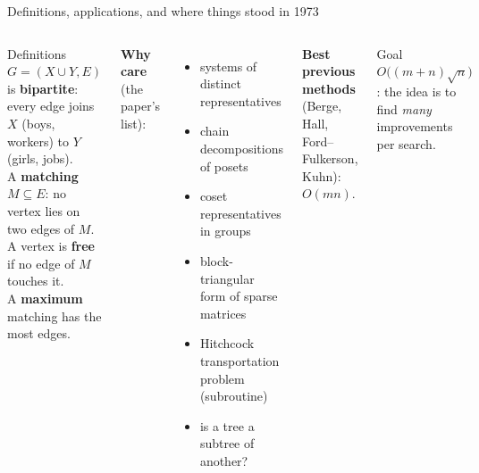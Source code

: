 \documentclass[aspectratio=169,11pt]{beamer}
\begin{document}
\begin{frame}{Definitions, applications, and where things stood in 1973}
\begin{columns}[T]
\begin{block}{Definitions}
$G=(X\cup Y,E)$ is \textbf{bipartite}: every edge joins $X$ (boys, workers) to $Y$ (girls, jobs).\\[2pt]
A \textbf{matching} $M\subseteq E$: no vertex lies on two edges of $M$.\\[2pt]
A vertex is \textbf{free} if no edge of $M$ touches it.\\[2pt]
A \textbf{maximum} matching has the most edges.
\end{block}
\textbf{Why care} (the paper's list):
\begin{itemize}\setlength\itemsep{2pt}\small
  \item systems of distinct representatives
  \item chain decompositions of posets
  \item coset representatives in groups
  \item block-triangular form of sparse matrices
  \item Hitchcock transportation problem (subroutine)
  \item is a tree a subtree of another?
\end{itemize}
\vspace{1mm}
\textbf{Best previous methods} (Berge, Hall, Ford--Fulkerson, Kuhn): $O(mn)$.
\begin{alertblock}{Goal}
$O\big((m+n)\sqrt n\big)$: the idea is to find \emph{many} improvements per search.
\end{alertblock}
\end{columns}
\end{frame}
\end{document}
